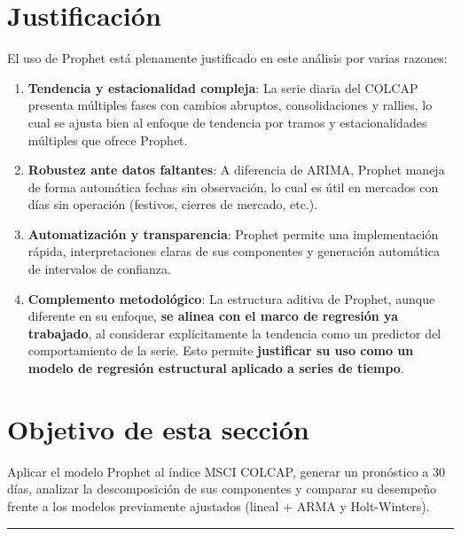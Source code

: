 \documentclass[
  11pt,
]{book}
\begin{document}
\section{Justificación}\label{justificaciuxf3n-1}

El uso de Prophet está plenamente justificado en este análisis por varias razones:

\begin{enumerate}
\def\labelenumi{\arabic{enumi}.}
\item
  \textbf{Tendencia y estacionalidad compleja}: La serie diaria del COLCAP presenta múltiples fases con cambios abruptos, consolidaciones y rallies, lo cual se ajusta bien al enfoque de tendencia por tramos y estacionalidades múltiples que ofrece Prophet.
\item
  \textbf{Robustez ante datos faltantes}: A diferencia de ARIMA, Prophet maneja de forma automática fechas sin observación, lo cual es útil en mercados con días sin operación (festivos, cierres de mercado, etc.).
\item
  \textbf{Automatización y transparencia}: Prophet permite una implementación rápida, interpretaciones claras de sus componentes y generación automática de intervalos de confianza.
\item
  \textbf{Complemento metodológico}: La estructura aditiva de Prophet, aunque diferente en su enfoque, \textbf{se alinea con el marco de regresión ya trabajado}, al considerar explícitamente la tendencia como un predictor del comportamiento de la serie. Esto permite \textbf{justificar su uso como un modelo de regresión estructural aplicado a series de tiempo}.
\end{enumerate}

\section{Objetivo de esta sección}\label{objetivo-de-esta-secciuxf3n}

Aplicar el modelo Prophet al índice MSCI COLCAP, generar un pronóstico a 30 días, analizar la descomposición de sus componentes y comparar su desempeño frente a los modelos previamente ajustados (lineal + ARMA y Holt-Winters).

\begin{center}\rule{0.5\linewidth}{0.5pt}\end{center}
\end{document}
